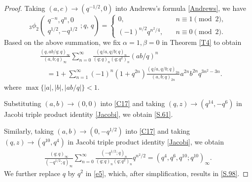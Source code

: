 \documentclass[reqno,12pt]{amsart}
\theoremstyle{remark}
\numberwithin{equation}{section}
\begin{document}
\begin{proof}
Taking $\left(a,c\right)\to\left(q^{-1/2},0\right)$ into Andrews's formula \eqref{Andrews}, we have
\begin{equation*}
_3\phi_2\left(
\begin{array}{ccc}
q^{-n},q^{n},0\\
q^{1/2},-q^{1/2}
\end{array};q,\,q\right)
=\left\{\begin{array}{ll}
0,&\quad n\equiv1\pmod2,\\
\left(-1\right)^{{n}/{2}}
q^{{n^2}/{4}},&\quad n\equiv0\pmod2.
\end{array}
\right.
\end{equation*}
Based on the above summation, we fix $\alpha=1,\beta=0$ in  Theorem \ref{T4} to obtain
\begin{align}
&\frac{\left(q,ab/q;q\right)_{\infty}}{\left(a,b;q\right)_{\infty}}
\sum_{n=0}^{\infty}\frac{\left(q/a,q/b;q\right)_{n}}
{\left(q;q\right)_{n}\left(q;q^2\right)_{n}}
\left(ab/q\right)^n\nonumber\\
&\quad=1+\sum_{n=1}^{\infty}\left(-1\right)^n\left(1+q^{2n}\right)
\frac{\left(q/a,q/b;q\right)_{2n}}{\left(a,b;q\right)_{2n}}
a^{2n}b^{2n}q^{3n^2-3n}.\label{C17}
\end{align}
where $\max\{|a|,|b|,|ab/q|\}<1$.

Substituting $\left(a,b\right)\to\left(0,0\right)$ into \eqref{C17} and taking $\left(q,z\right)\to\left(q^{14},-q^6\right)$ in Jacobi triple product identity \eqref{Jacobi}, we obtain \eqref{S.61}.

Similarly, taking $\left(a,b\right)\to\left(0,-q^{1/2}\right)$ into \eqref{C17} and taking $\left(q,z\right)\to\left(q^{10},q^4\right)$ in Jacobi triple product identity \eqref{Jacobi}, we obtain
\begin{align}
\frac{\left(q;q\right)_{\infty}}{\left(-q^{1/2};q\right)_{\infty}}
\sum_{n=0}^{\infty}\frac{\left(-q^{1/2};q\right)_n}
{\left(q;q\right)_n\left(q;q^2\right)_{n}}q^{{n^2}/{2}}
=\left(q^4,q^6,q^{10};q^{10}\right)_{\infty}.\label{e5}
\end{align}
We further replace $q$ by $q^2$ in \eqref{e5}, which, after simplification, results in \eqref{S.98}.
\end{proof}
\end{document}
